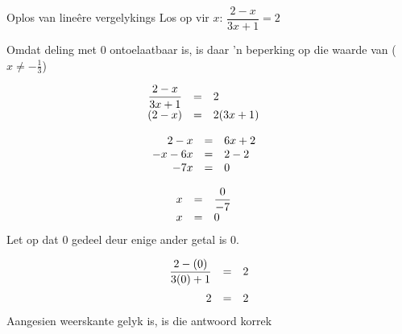 \begin{wex}{Oplos van lineêre vergelykings}
{Los op vir $x$: $\dfrac{2-x}{3x+1}=2$} 
{
Omdat deling met $0$ ontoelaatbaar is, is daar ’n beperking op die waarde van ($x\neq -\frac{1}{3}$)

\begin{equation*}
    \begin{array}{ccll}\hfill \dfrac{2-x}{3x+1}& =& 2\hfill & \\
	\hfill (2-x)& =& 2(3x+1)\hfill & \\ 
    \end{array}
\end{equation*}

\begin{equation*}
    \begin{array}{ccll}
	\hfill 2-x& =& 6x+2\hfill & \hfill \\ 
	\hfill -x-6x& =& 2-2\hfill & \hfill \\ 
	\hfill -7x& =& 0\hfill & \hfill
    \end{array}
\end{equation*}

\begin{equation*}
    \begin{array}{ccll}

	\hfill x& =& \dfrac{0}{-7}\hfill & \\
	\hfill x& =& 0\hfill & \hfill 
    \end{array}
\end{equation*}
Let op dat $0$ gedeel deur enige ander getal is $0$.


\begin{equation*}
    \begin{array}{ccc}\hfill \dfrac{2-(0)}{3(0)+1}& =& 2\hfill \vspace{6pt}\\
	\hfill 2& =& 2\hfill 
\end{array}
\end{equation*}
Aangesien weerskante gelyk is, is die antwoord korrek
}
\end{wex}


